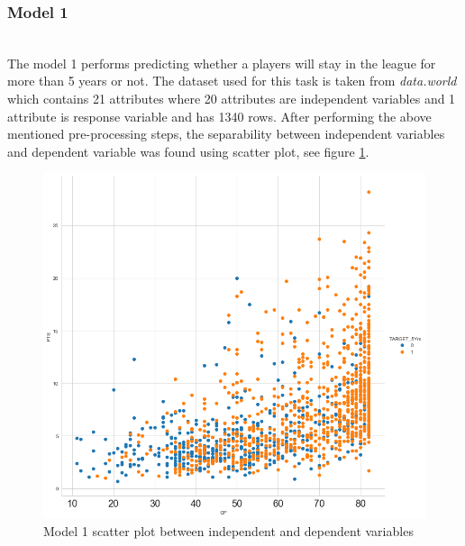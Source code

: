 \documentclass[format=sigconf]{acmart}
\begin{document}
\subsubsection{Model 1}
\hfill\\
The model 1 performs predicting whether a players will stay in the league for more than 5 years or not. The dataset used for this
task is taken from \textit{data.world} which contains 21 attributes where 20 attributes are independent variables and
1 attribute is response variable and has 1340 rows. After performing the above mentioned pre-processing steps, the separability
between independent variables and dependent variable was found using scatter plot, see figure \ref{fig:model1scatter}.
\begin{figure}[H]
    \centering
    \includegraphics[scale=0.25]{model_1_scatter_plot.png}
    \caption{Model 1 scatter plot between independent and dependent variables}
    \label{fig:model1scatter}
\end{figure}


\end{document}
